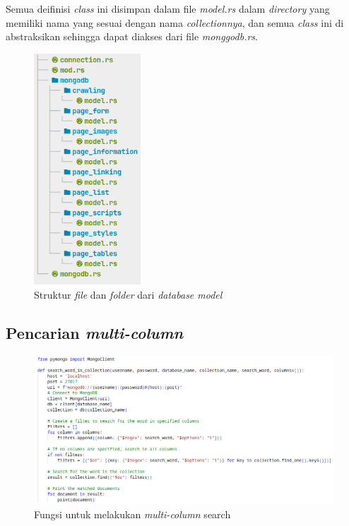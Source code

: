 Semua deifinisi \emph{class} ini disimpan dalam file \emph{model.rs} dalam \emph{directory} yang memiliki nama yang sesuai dengan nama \emph{collectionnya}, dan semua \emph{class} ini di abstraksikan sehingga dapat diakses dari file \emph{monggodb.rs}.

\begin{figure}[H]
  \centering
  \includegraphics[keepaspectratio, width=4cm]{gambar/file-structure-db-util.png}
  \caption{Struktur \emph{file} dan \emph{folder} dari \emph{database model}}
  \label{gambar:file-structure-db-util}
\end{figure}

\subsection{Pencarian \emph{multi-column}}

\begin{figure}[H]
  \centering
  \includegraphics[keepaspectratio, width=14cm]{gambar/onequery-code.png}
  \caption{Fungsi untuk melakukan \emph{multi-column} search}
  \label{gambar:onequery-code}
\end{figure}


